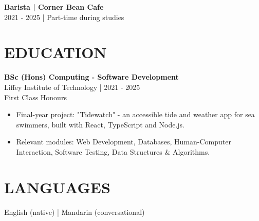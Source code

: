\documentclass[11pt,a4paper]{article}
\newcommand{\cvsection}[1]{\section*{#1}}
\begin{document}
\textbf{Barista | Corner Bean Cafe}\\
2021 - 2025 | Part-time during studies

\cvsection{EDUCATION}
\textbf{BSc (Hons) Computing - Software Development}\\
Liffey Institute of Technology | 2021 - 2025\\
First Class Honours
\begin{itemize}
\item Final-year project: "Tidewatch" - an accessible tide and weather app for sea swimmers, built with React, TypeScript and Node.js.
\item Relevant modules: Web Development, Databases, Human-Computer Interaction, Software Testing, Data Structures \& Algorithms.
\end{itemize}

\cvsection{LANGUAGES}
English (native) | Mandarin (conversational)
\end{document}
